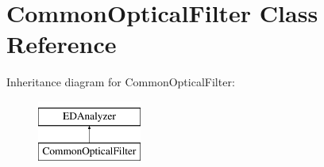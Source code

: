 \hypertarget{classCommonOpticalFilter}{}\section{Common\+Optical\+Filter Class Reference}
\label{classCommonOpticalFilter}
Inheritance diagram for Common\+Optical\+Filter\+:\begin{figure}[H]
\begin{center}
\leavevmode
\includegraphics[height=2.000000cm]{classCommonOpticalFilter}
\end{center}
\end{figure}
